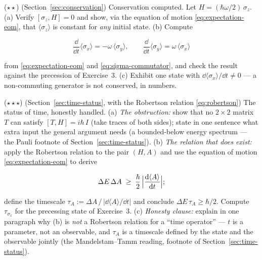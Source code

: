 \begin{problemset}
\item ($\star\star$) (Section~\ref{sec:conservation}) Conservation computed. Let $H = (\hbar\omega/2)\,\sigma_z$. (a) Verify $[\sigma_z,H] = 0$ and show, via the equation of motion \eqref{eq:expectation-eom}, that $\langle\sigma_z\rangle$ is constant for \emph{any} initial state. (b) Compute
\begin{linenomath}
    \begin{equation}
        \frac{\dd}{\dd t}\langle\sigma_x\rangle = -\omega\,\langle\sigma_y\rangle,
        \qquad
        \frac{\dd}{\dd t}\langle\sigma_y\rangle = \omega\,\langle\sigma_x\rangle
    \end{equation}
\end{linenomath}
from \eqref{eq:expectation-eom} and \eqref{eq:sigma-commutator}, and check the result against the precession of Exercise~3. (c) Exhibit one state with $\dd\langle\sigma_x\rangle/\dd t \neq 0$ --- a non-commuting generator is not conserved, in numbers.

\item ($\star\star\star$) (Section~\ref{sec:time-status}, with the Robertson relation \eqref{eq:robertson}) The status of time, honestly handled. (a) \emph{The obstruction:} show that no $2\times2$ matrix $T$ can satisfy $[T,H] = i\hbar\,I$ (take traces of both sides); state in one sentence what extra input the general argument needs (a bounded-below energy spectrum --- the Pauli footnote of Section~\ref{sec:time-status}). (b) \emph{The relation that does exist:} apply the Robertson relation to the pair $(H,A)$ and use the equation of motion \eqref{eq:expectation-eom} to derive
\begin{linenomath}
    \begin{equation}
        \Delta E\,\Delta A \;\geq\; \frac{\hbar}{2}\,\Bigl|\frac{\mathrm{d}\langle A\rangle}{\mathrm{d} t}\Bigr| ;
    \end{equation}
\end{linenomath}
define the timescale $\tau_A := \Delta A\,/\,\bigl|\dd\langle A\rangle/\dd t\bigr|$ and conclude $\Delta E\,\tau_A \geq \hbar/2$. Compute $\tau_{\sigma_x}$ for the precessing state of Exercise~3. (c) \emph{Honesty clause:} explain in one paragraph why (b) is \emph{not} a Robertson relation for a ``time operator'' --- $t$ is a parameter, not an observable, and $\tau_A$ is a timescale defined by the state and the observable jointly (the Mandelstam--Tamm reading, footnote of Section~\ref{sec:time-status}).


\end{problemset}
